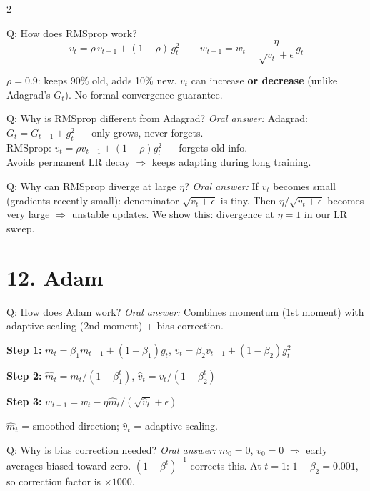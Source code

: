 \documentclass[a4paper,9pt]{article}
\newcommand{\oral}{\textit{\color{darkgray}Oral answer: }}
\begin{document}
\begin{multicols}{2}
\begin{qa}{Q: How does RMSprop work?}
\[
v_t = \rho\, v_{t-1} + (1-\rho)\,g_t^2
\qquad
w_{t+1} = w_t - \frac{\eta}{\sqrt{v_t}+\epsilon}\, g_t
\]

\(\rho=0.9\): keeps 90\% old, adds 10\% new.
\(v_t\) can increase \textbf{or decrease} (unlike Adagrad's \(G_t\)).
No formal convergence guarantee.
\end{qa}

\begin{qa}{Q: Why is RMSprop different from Adagrad?}
\oral Adagrad: \(G_t = G_{t-1} + g_t^2\) --- only grows, never forgets.\\
RMSprop: \(v_t = \rho v_{t-1} + (1-\rho)g_t^2\) --- forgets old info.\\
Avoids permanent LR decay \(\Rightarrow\) keeps adapting during long training.
\end{qa}

\begin{qa}{Q: Why can RMSprop diverge at large \(\eta\)?}
\oral If \(v_t\) becomes small (gradients recently small): denominator \(\sqrt{v_t+\epsilon}\) is tiny.
Then \(\eta/\sqrt{v_t+\epsilon}\) becomes very large \(\Rightarrow\) unstable updates.
We show this: divergence at \(\eta=1\) in our LR sweep.
\end{qa}

\section{12. Adam}

\begin{qa}{Q: How does Adam work?}
\oral Combines momentum (1st moment) with adaptive scaling (2nd moment) + bias correction.

\textbf{Step 1:} \(m_t = \beta_1 m_{t-1} + (1-\beta_1)g_t\), \quad \(v_t = \beta_2 v_{t-1} + (1-\beta_2)g_t^2\)

\textbf{Step 2:} \(\hat m_t = m_t/(1-\beta_1^t)\), \quad \(\hat v_t = v_t/(1-\beta_2^t)\)

\textbf{Step 3:} \(w_{t+1} = w_t - \eta\hat m_t / (\sqrt{\hat v_t}+\epsilon)\)

\(\hat m_t\) = smoothed direction; \(\hat v_t\) = adaptive scaling.
\end{qa}

\begin{qa}{Q: Why is bias correction needed?}
\oral \(m_0=0\), \(v_0=0\) \(\Rightarrow\) early averages biased toward zero.
\((1-\beta^t)^{-1}\) corrects this.
At \(t=1\): \(1-\beta_2 = 0.001\), so correction factor is \(\times 1000\).
\end{qa}


\end{multicols}
\end{document}
